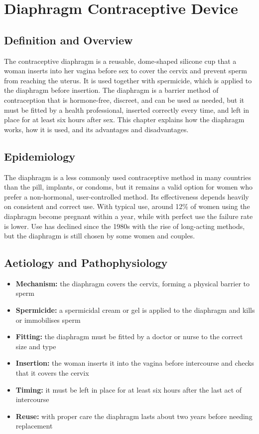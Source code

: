 \chapter{Diaphragm Contraceptive Device}

\section*{Definition and Overview}
The contraceptive diaphragm is a reusable, dome-shaped silicone cup that a woman inserts into her vagina before sex to cover the cervix and prevent sperm from reaching the uterus. It is used together with spermicide, which is applied to the diaphragm before insertion. The diaphragm is a barrier method of contraception that is hormone-free, discreet, and can be used as needed, but it must be fitted by a health professional, inserted correctly every time, and left in place for at least six hours after sex. This chapter explains how the diaphragm works, how it is used, and its advantages and disadvantages.

\section*{Epidemiology}
The diaphragm is a less commonly used contraceptive method in many countries than the pill, implants, or condoms, but it remains a valid option for women who prefer a non-hormonal, user-controlled method. Its effectiveness depends heavily on consistent and correct use. With typical use, around 12\% of women using the diaphragm become pregnant within a year, while with perfect use the failure rate is lower. Use has declined since the 1980s with the rise of long-acting methods, but the diaphragm is still chosen by some women and couples.

\section*{Aetiology and Pathophysiology}
\begin{itemize}
    \item \textbf{Mechanism:} the diaphragm covers the cervix, forming a physical barrier to sperm
    \item \textbf{Spermicide:} a spermicidal cream or gel is applied to the diaphragm and kills or immobilises sperm
    \item \textbf{Fitting:} the diaphragm must be fitted by a doctor or nurse to the correct size and type
    \item \textbf{Insertion:} the woman inserts it into the vagina before intercourse and checks that it covers the cervix
    \item \textbf{Timing:} it must be left in place for at least six hours after the last act of intercourse
    \item \textbf{Reuse:} with proper care the diaphragm lasts about two years before needing replacement
\end{itemize}

